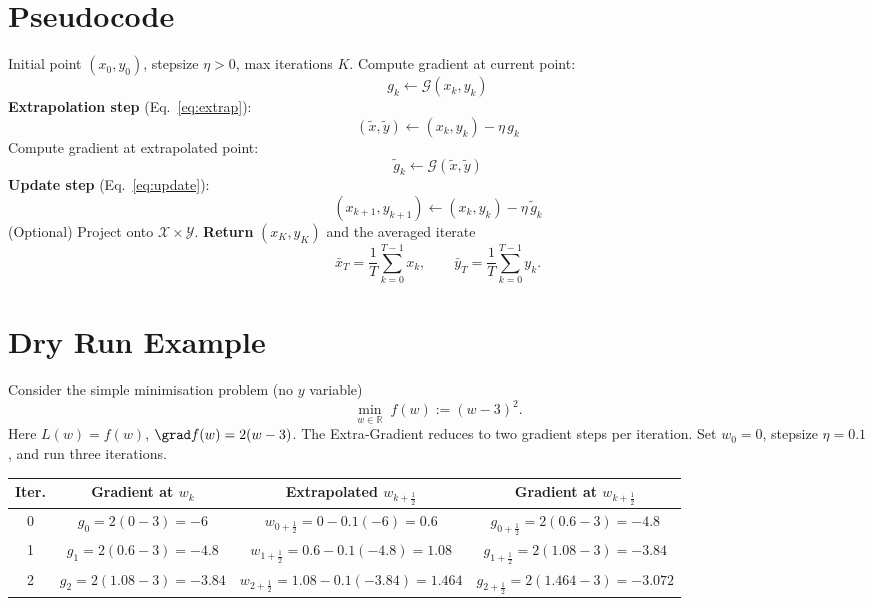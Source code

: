 \documentclass{article}
\newcommand{\R}{\mathbb{R}}
\newcommand{\G}{\mathcal{G}}
\begin{document}
\section*{Pseudocode}
\begin{algorithm}[H]
\caption{Deterministic Extra‑Gradient for $\min_x\max_y L(x,y)$}
\begin{algorithmic}[1]
\Require Initial point $(x_0,y_0)$, stepsize $\eta>0$, max iterations $K$.
    \State Compute gradient at current point:
    \[
    g_k\gets \G(x_k,y_k)
    \]
    \State \textbf{Extrapolation step} (Eq.~\eqref{eq:extrap}):
    \[
    (\tilde x,\tilde y)\gets (x_k,y_k)-\eta\,g_k
    \]
    \State Compute gradient at extrapolated point:
    \[
    \tilde g_k\gets \G(\tilde x,\tilde y)
    \]
    \State \textbf{Update step} (Eq.~\eqref{eq:update}):
    \[
    (x_{k+1},y_{k+1})\gets (x_k,y_k)-\eta\,\tilde g_k
    \]
    \State (Optional) Project onto $\mathcal{X}\times\mathcal{Y}$.
\EndFor
\State \textbf{Return} $(x_K,y_K)$ and the averaged iterate 
\[
\bar x_T=\frac1T\sum_{k=0}^{T-1}x_k,\qquad 
\bar y_T=\frac1T\sum_{k=0}^{T-1}y_k .
\]
\end{algorithmic}
\end{algorithm}

\section*{Dry Run Example}
Consider the simple minimisation problem (no $y$ variable)  
\[
\min_{w\in\R} \; f(w):=(w-3)^2 .
\]
Here $L(w)=f(w)$, $\grad f(w)=2(w-3)$.  
The Extra‑Gradient reduces to two gradient steps per iteration.
Set $w_0=0$, stepsize $\eta=0.1$, and run three iterations.

\begin{center}
\begin{tabular}{c|c|c|c}
\textbf{Iter.}&\textbf{Gradient at $w_k$}&\textbf{Extrapolated $w_{k+\frac12}$}&\textbf{Gradient at $w_{k+\frac12}$}\\\hline
0 & $g_0=2(0-3)=-6$ & $w_{0+\frac12}=0-0.1(-6)=0.6$ & $g_{0+\frac12}=2(0.6-3)=-4.8$\\
1 & $g_1=2(0.6-3)=-4.8$ & $w_{1+\frac12}=0.6-0.1(-4.8)=1.08$ & $g_{1+\frac12}=2(1.08-3)=-3.84$\\
2 & $g_2=2(1.08-3)=-3.84$ & $w_{2+\frac12}=1.08-0.1(-3.84)=1.464$ & $g_{2+\frac12}=2(1.464-3)=-3.072$\\
\end{tabular}
\end{center}
\end{document}
